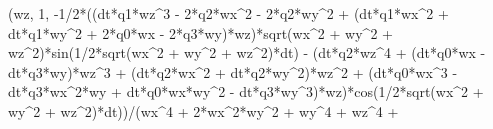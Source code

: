\documentclass[]{article}
\newenvironment{Shaded}{}{}
\newcommand{\DecValTok}[1]{\textcolor[rgb]{0.25,0.63,0.44}{#1}}
\newcommand{\OperatorTok}[1]{\textcolor[rgb]{0.40,0.40,0.40}{#1}}
\newcommand{\NormalTok}[1]{#1}
\begin{document}
\begin{Shaded}
\begin{Highlighting}[]
\NormalTok{(wz, }\DecValTok{1}\NormalTok{, }\OperatorTok{-}\DecValTok{1}\OperatorTok{/}\DecValTok{2}\OperatorTok{*}\NormalTok{((dt}\OperatorTok{*}\NormalTok{q1}\OperatorTok{*}\NormalTok{wz}\OperatorTok{^}\DecValTok{3} \OperatorTok{-} \DecValTok{2}\OperatorTok{*}\NormalTok{q2}\OperatorTok{*}\NormalTok{wx}\OperatorTok{^}\DecValTok{2} \OperatorTok{-} \DecValTok{2}\OperatorTok{*}\NormalTok{q2}\OperatorTok{*}\NormalTok{wy}\OperatorTok{^}\DecValTok{2} \OperatorTok{+}\NormalTok{ (dt}\OperatorTok{*}\NormalTok{q1}\OperatorTok{*}\NormalTok{wx}\OperatorTok{^}\DecValTok{2} \OperatorTok{+}\NormalTok{ dt}\OperatorTok{*}\NormalTok{q1}\OperatorTok{*}\NormalTok{wy}\OperatorTok{^}\DecValTok{2} \OperatorTok{+} \DecValTok{2}\OperatorTok{*}\NormalTok{q0}\OperatorTok{*}\NormalTok{wx }\OperatorTok{-} \DecValTok{2}\OperatorTok{*}\NormalTok{q3}\OperatorTok{*}\NormalTok{wy)}\OperatorTok{*}\NormalTok{wz)}\OperatorTok{*}\NormalTok{sqrt(wx}\OperatorTok{^}\DecValTok{2} \OperatorTok{+}\NormalTok{ wy}\OperatorTok{^}\DecValTok{2} \OperatorTok{+}\NormalTok{ wz}\OperatorTok{^}\DecValTok{2}\NormalTok{)}\OperatorTok{*}\NormalTok{sin(}\DecValTok{1}\OperatorTok{/}\DecValTok{2}\OperatorTok{*}\NormalTok{sqrt(wx}\OperatorTok{^}\DecValTok{2} \OperatorTok{+}\NormalTok{ wy}\OperatorTok{^}\DecValTok{2} \OperatorTok{+}\NormalTok{ wz}\OperatorTok{^}\DecValTok{2}\NormalTok{)}\OperatorTok{*}\NormalTok{dt) }\OperatorTok{-}\NormalTok{ (dt}\OperatorTok{*}\NormalTok{q2}\OperatorTok{*}\NormalTok{wz}\OperatorTok{^}\DecValTok{4} \OperatorTok{+}\NormalTok{ (dt}\OperatorTok{*}\NormalTok{q0}\OperatorTok{*}\NormalTok{wx }\OperatorTok{-}\NormalTok{ dt}\OperatorTok{*}\NormalTok{q3}\OperatorTok{*}\NormalTok{wy)}\OperatorTok{*}\NormalTok{wz}\OperatorTok{^}\DecValTok{3} \OperatorTok{+}\NormalTok{ (dt}\OperatorTok{*}\NormalTok{q2}\OperatorTok{*}\NormalTok{wx}\OperatorTok{^}\DecValTok{2} \OperatorTok{+}\NormalTok{ dt}\OperatorTok{*}\NormalTok{q2}\OperatorTok{*}\NormalTok{wy}\OperatorTok{^}\DecValTok{2}\NormalTok{)}\OperatorTok{*}\NormalTok{wz}\OperatorTok{^}\DecValTok{2} \OperatorTok{+}\NormalTok{ (dt}\OperatorTok{*}\NormalTok{q0}\OperatorTok{*}\NormalTok{wx}\OperatorTok{^}\DecValTok{3} \OperatorTok{-}\NormalTok{ dt}\OperatorTok{*}\NormalTok{q3}\OperatorTok{*}\NormalTok{wx}\OperatorTok{^}\DecValTok{2}\OperatorTok{*}\NormalTok{wy }\OperatorTok{+}\NormalTok{ dt}\OperatorTok{*}\NormalTok{q0}\OperatorTok{*}\NormalTok{wx}\OperatorTok{*}\NormalTok{wy}\OperatorTok{^}\DecValTok{2} \OperatorTok{-}\NormalTok{ dt}\OperatorTok{*}\NormalTok{q3}\OperatorTok{*}\NormalTok{wy}\OperatorTok{^}\DecValTok{3}\NormalTok{)}\OperatorTok{*}\NormalTok{wz)}\OperatorTok{*}\NormalTok{cos(}\DecValTok{1}\OperatorTok{/}\DecValTok{2}\OperatorTok{*}\NormalTok{sqrt(wx}\OperatorTok{^}\DecValTok{2} \OperatorTok{+}\NormalTok{ wy}\OperatorTok{^}\DecValTok{2} \OperatorTok{+}\NormalTok{ wz}\OperatorTok{^}\DecValTok{2}\NormalTok{)}\OperatorTok{*}\NormalTok{dt))}\OperatorTok{/}\NormalTok{(wx}\OperatorTok{^}\DecValTok{4} \OperatorTok{+} \DecValTok{2}\OperatorTok{*}\NormalTok{wx}\OperatorTok{^}\DecValTok{2}\OperatorTok{*}\NormalTok{wy}\OperatorTok{^}\DecValTok{2} \OperatorTok{+}\NormalTok{ wy}\OperatorTok{^}\DecValTok{4} \OperatorTok{+}\NormalTok{ wz}\OperatorTok{^}\DecValTok{4} \OperatorTok{+} 
\end{Highlighting}
\end{Shaded}
\end{document}

